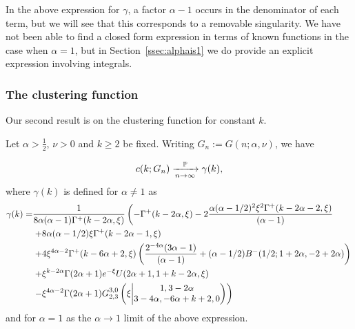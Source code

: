 In the above expression for $\gamma$, a factor $\alpha-1$ occurs in the denominator of each term, but we will see that this
corresponds to a removable singularity. We have not been able to find a closed form expression in terms of known functions in the case when $\alpha=1$, but in Section~\ref{ssec:alphais1} we do provide an explicit expression involving integrals.


\subsubsection{The clustering function}

Our second result is on the clustering function for constant $k$.

\begin{theorem}\label{thm:local_clustering_hyperbolic}\label{thm:mainkfixed}
Let $\alpha > \frac{1}{2}$, $\nu > 0$ and $k\geq2$ be fixed. 
Writing $G_n := G(n;\alpha,\nu)$, we have

\[
	c(k;G_n) \xrightarrow[n\to\infty]{\Pee} \gamma(k),
\]
where $\gamma(k)$ is defined for $\alpha \ne 1$ as 
\begin{align*}
\gamma(k)  =&\frac{1}{8\alpha (\alpha-1)\Gamma^+(k-2\alpha,\xi)} \left( -\Gamma^+(k - 2 \alpha, \xi) - 2\frac{\alpha (\alpha - 1/2)^2 \xi^{2} \Gamma^+(k - 2 \alpha - 2, \xi)}{(\alpha - 1)} \right. \\ 
&\left.+ 8 \alpha (\alpha - 1/2) \xi \Gamma^+(k - 2 \alpha - 1,\xi) \right.\\ 
&\left.+ 4\xi^{4\alpha - 2} \Gamma^+(k - 6 \alpha + 2, 
      \xi) \left( \frac{2^{ - 4\alpha}(3 \alpha - 1)}{(\alpha - 1)} + (\alpha - 1/2) B^-(1/2; 1 + 2 \alpha, -2 + 2 \alpha) \right)  \right.\\ 
&\left.+ \xi^{k-2\alpha} \Gamma(2\alpha+1)e^{-\xi} U(2\alpha+1,1+k-2\alpha,\xi) \right. \\ 
&\left.- \xi^{4\alpha-2} \Gamma(2\alpha+1)\MeijerGnew{3}{0}{2}{3}{1,3-2\alpha}{3-4\alpha,-6\alpha+k+2,0}{\xi}  \right)
\end{align*}
and for $\alpha = 1$ as the $\alpha\to1$ limit of the above expression.
\end{theorem}


